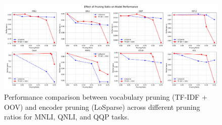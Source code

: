 \documentclass[twocolumn]{article}
\begin{document}
\begin{figure}[t]
    \centering
    \includegraphics[width=\linewidth]{images/pruning_ratios.png}
    \caption{Performance comparison between vocabulary pruning (TF-IDF + OOV) and encoder pruning (LoSparse) across different pruning ratios for MNLI, QNLI, and QQP tasks. }
    \label{fig:pruning_ratio}
\end{figure}
\end{document}
